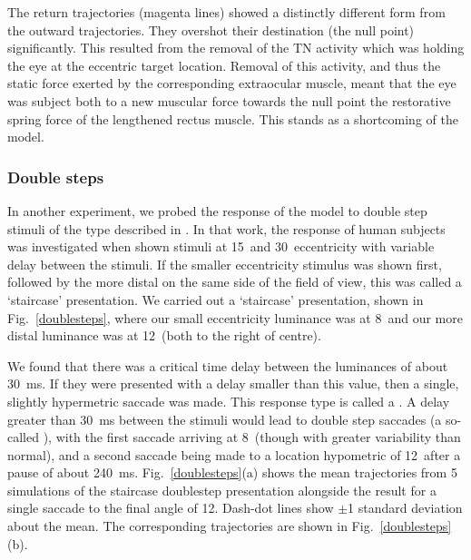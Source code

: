 \documentclass{frontiersSCNS}
\begin{document}
The return trajectories (magenta lines) showed a distinctly different
form from the outward trajectories. They overshot their destination
(the null point) significantly. This resulted from the removal of the
TN activity which was holding the eye at the eccentric target
location. Removal of this activity, and thus the static force exerted
by the corresponding extraocular muscle, meant that the eye was
subject both to a new muscular force towards the null point
 the restorative spring force of the lengthened rectus
muscle. This stands as a shortcoming of the model.

\subsubsection{Double steps}

In another experiment, we probed the response of the model to double
step stimuli of the type described in \cite{becker_analysis_1979}. In
that work, the response of human subjects was investigated when shown
stimuli at 15\dg~and 30\dg~eccentricity with variable delay between
the stimuli. If the smaller eccentricity stimulus was shown first,
followed by the more distal on the same side of the field of view,
this was called a `staircase' presentation.
We carried out a `staircase' presentation, shown in
Fig.~\ref{doublesteps}, where our small eccentricity luminance was at
8\dg~and our more distal luminance was at 12\dg~(both to the right of
centre). 

We found that there was a critical time delay between the
luminances of about 30~ms. If they were presented with a delay smaller
than this value, then a single, slightly hypermetric saccade was
made. This response type is called a . A delay
greater than 30~ms between the stimuli would lead to double step
saccades (a so-called ), with the first
saccade arriving at 8\dg~(though with greater variability than
normal), and a second saccade being made to a location hypometric of
12\dg~after a pause of about 240~ms.  Fig.~\ref{doublesteps}(a) shows
the mean trajectories from 5 simulations of the staircase doublestep
presentation alongside the result for a single saccade to the final
angle of 12\dg. Dash-dot lines show $\pm$1 standard deviation about
the mean. The corresponding trajectories are shown in
Fig.~\ref{doublesteps}(b).
\end{document}
